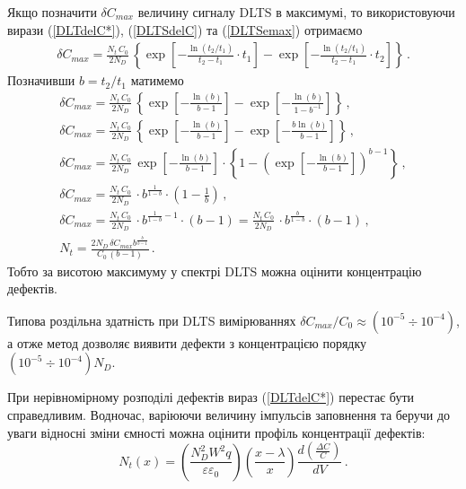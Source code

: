 Якщо позначити $\delta C_{max}$ величину сигналу DLTS в максимумі,
то використовуючи вирази (\ref{DLTdelC*}), (\ref{DLTSdelC}) та (\ref{DLTSemax}) отримаємо
\begin{gather*}
  \delta C_{max}=\frac{N_t\,C_0}{2N_D}\,\left\{\exp\left[-\frac{\ln\left(t_2/t_1\right)}{t_2-t_1}\cdot t_1\right]
     -\exp\left[-\frac{\ln\left(t_2/t_1\right)}{t_2-t_1}\cdot t_2\right]\right\}\,.\nonumber
\end{gather*}
Позначивши $b=t_2/t_1$ матимемо
\begin{gather}
  \delta C_{max}=\frac{N_t\,C_0}{2N_D}\,\left\{\exp\left[-\frac{\ln\left(b\right)}{b-1}\right]
     -\exp\left[-\frac{\ln\left(b\right)}{1-b^{-1}} \right]\right\}\,,\nonumber\\
  \delta C_{max}=\frac{N_t\,C_0}{2N_D}\,\left\{\exp\left[-\frac{\ln\left(b\right)}{b-1}\right]
     -\exp\left[-\frac{b\ln\left(b\right)}{b-1} \right]\right\}\,,\nonumber\\
  \delta C_{max}=\frac{N_t\,C_0}{2N_D}\,\exp\left[-\frac{\ln\left(b\right)}{b-1}\right]\cdot
  \left\{1 -\left(\exp\left[-\frac{\ln\left(b\right)}{b-1} \right]\right)^{b-1}\right\}\,,\nonumber  \\
  \delta C_{max}=\frac{N_t\,C_0}{2N_D}\,\cdot b^{\frac{1}{1-b}}\cdot
  \left(1-\frac{1}{b}\right)\,,\nonumber     \\
    \delta C_{max}=\frac{N_t\,C_0}{2N_D}\,\cdot b^{\frac{1}{1-b}-1}\cdot \left(b-1\right)
                  =\frac{N_t\,C_0}{2N_D}\,\cdot b^{\frac{b}{1-b}}\cdot \left(b-1\right)\,,\nonumber \\
    N_t=\frac{2N_D\,\delta C_{max}b^{\frac{b}{b-1}}}{C_0\,(b-1)}\,.
\end{gather}
Тобто за висотою максимуму у спектрі DLTS можна  оцінити концентрацію дефектів.

Типова роздільна здатність при DLTS вимірюваннях $\delta C_{max}/C_0\approx(10^{-5}\div 10^{-4})$,
а отже метод дозволяє виявити дефекти з концентрацією порядку $(10^{-5}\div 10^{-4})N_D$.


При нерівномірному розподілі дефектів вираз (\ref{DLTdelC*}) перестає бути справедливим.
Водночас, варіюючи величину імпульсів заповнення та беручи до уваги відносні зміни ємності
можна оцінити профіль концентрації дефектів:
\begin{equation}
\label{DLTSNt}
N_t(x)=\left(\frac{N_D^2W^2q}{\varepsilon\varepsilon_0}\right)\left(\frac{x-\lambda}{x}\right)\frac{d\left(\frac{\Delta C}{C}\right)}{dV}\,.
\end{equation}

